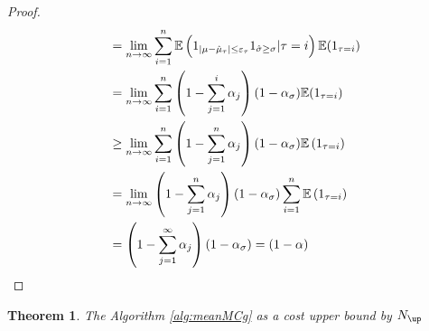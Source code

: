 \documentclass{iitthesis}
\newtheorem{theorem}{Theorem}[section]
\begin{document}
\begin{proof}
\begin{align}
&= \lim_{n \to \infty}\sum_{i=1}^{n} \mathbb{E}\left(1_{\left \lvert \mu-\hat{\mu}_\tau \right \rvert \leq \varepsilon_\tau}1_{\hat{\sigma} \geq \sigma}|\tau = i\right) \mathbb{E}(1_{\tau=i})\\
& = \lim_{n \to \infty}\sum_{i=1}^n\left(1-\sum_{j=1}^i\alpha_j\right)(1-\alpha_{\sigma})\mathbb{E}(1_{\tau=i})\\
& \geq \lim_{n \to \infty} \sum_{i=1}^n\left(1-\sum_{j=1}^n\alpha_j\right)(1-\alpha_{\sigma})\mathbb{E}\left(1_{\tau=i}\right) \\
& = \lim_{n \to \infty} \left(1-\sum_{j=1}^n\alpha_j\right)(1-\alpha_{\sigma})\sum_{i=1}^n \mathbb{E}\left(1_{\tau=i}\right) \\
&=\left(1-\sum_{j=1}^\infty \alpha_j\right)(1-\alpha_{\sigma})=(1-\alpha) \\
\end{align}
\end{proof}
\begin{theorem}
The Algorithm \ref{alg:meanMCg} as a cost upper bound by $N_{\up}$
\end{theorem}
\end{document}
